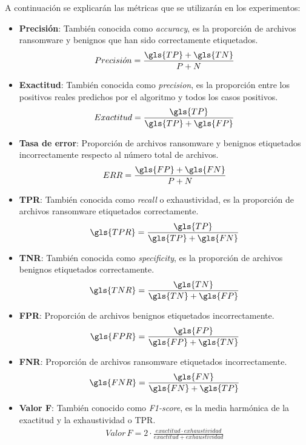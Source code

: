 \newpage

A continuación se explicarán las métricas que se utilizarán en los experimentos:

\begin{itemize}
    \item \textbf{Precisión}: También conocida como \textit{accuracy}, es la proporción de archivos ransomware y benignos que han sido correctamente etiquetados.
    \begin{align*} Precisi\acute{o}n = \frac{\gls{TP} + \gls{TN}}{P + N} \end{align*}
    
    \item \textbf{Exactitud}: También conocida como \textit{precision}, es la proporción entre los positivos reales predichos por el algoritmo y todos los casos positivos.
    \begin{align*} Exactitud = \frac{\gls{TP}}{\gls{TP} + \gls{FP}} \end{align*}
    
    \item \textbf{Tasa de error}: Proporción de archivos ransomware y benignos etiquetados incorrectamente respecto al número total de archivos.  \begin{align*} ERR = \frac{\gls{FP} + \gls{FN}}{P + N} \end{align*}
    
    \item \textbf{\gls{TPR}}: También conocida como \textit{recall} o exhaustividad, es la proporción de archivos ransomware etiquetados correctamente.
    \begin{align*} \gls{TPR} = \frac{\gls{TP}}{\gls{TP} + \gls{FN}}\end{align*}
    
    \item \textbf{\gls{TNR}}: También conocida como \textit{specificity}, es la proporción de archivos benignos etiquetados correctamente.
    \begin{align*} \gls{TNR} = \frac{\gls{TN}}{\gls{TN} + \gls{FP}}\end{align*}
    
    \item \textbf{\gls{FPR}}: Proporción de archivos benignos etiquetados incorrectamente.
    \begin{align*} \gls{FPR} = \frac{\gls{FP}}{\gls{FP} + \gls{TN}} \end{align*}
    
    \item \textbf{\gls{FNR}}: Proporción de archivos ransomware etiquetados incorrectamente.
    \begin{align*} \gls{FNR} = \frac{\gls{FN}}{\gls{FN} + \gls{TP}} \end{align*}
    
    \item \textbf{Valor F}: También conocido como \textit{F1-score}, es la media harmónica de la exactitud y la exhaustividad o \gls{TPR}.
    \begin{align*} Valor\,F = 2 \cdot\frac{exactitud \cdot exhaustividad}{exactitud + exhaustividad} \end{align*} 
\end{itemize}


